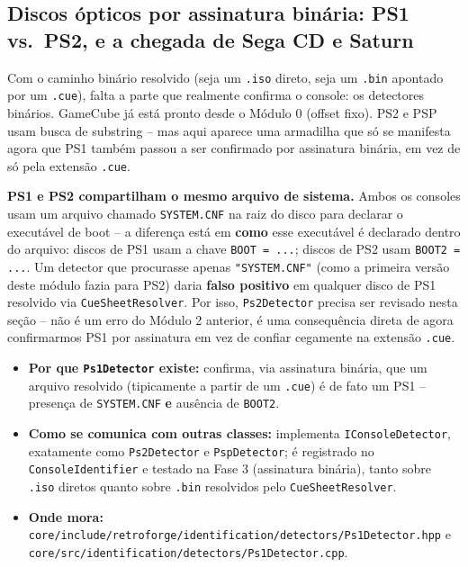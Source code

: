 \subsection{Discos ópticos por assinatura binária: PS1 vs.\ PS2, e a chegada de Sega CD e Saturn}

Com o caminho binário resolvido (seja um \texttt{.iso} direto, seja um \texttt{.bin} apontado por um \texttt{.cue}), falta a parte que realmente confirma o console: os detectores binários. GameCube já está pronto desde o Módulo 0 (offset fixo). PS2 e PSP usam busca de substring -- mas aqui aparece uma armadilha que só se manifesta agora que PS1 também passou a ser confirmado por assinatura binária, em vez de só pela extensão \texttt{.cue}.

\begin{CaixaAlerta}
\textbf{PS1 e PS2 compartilham o mesmo arquivo de sistema.} Ambos os consoles usam um arquivo chamado \texttt{SYSTEM.CNF} na raiz do disco para declarar o executável de boot -- a diferença está em \textbf{como} esse executável é declarado dentro do arquivo: discos de PS1 usam a chave \texttt{BOOT = ...}; discos de PS2 usam \texttt{BOOT2 = ...}. Um detector que procurasse apenas \texttt{"SYSTEM.CNF"} (como a primeira versão deste módulo fazia para PS2) daria \textbf{falso positivo} em qualquer disco de PS1 resolvido via \texttt{CueSheetResolver}. Por isso, \texttt{Ps2Detector} precisa ser revisado nesta seção -- não é um erro do Módulo 2 anterior, é uma consequência direta de agora confirmarmos PS1 por assinatura em vez de confiar cegamente na extensão \texttt{.cue}.
\end{CaixaAlerta}

\begin{itemize}
    \item \textbf{Por que \texttt{Ps1Detector} existe:} confirma, via assinatura binária, que um arquivo resolvido (tipicamente a partir de um \texttt{.cue}) é de fato um PS1 -- presença de \texttt{SYSTEM.CNF} \textbf{e} ausência de \texttt{BOOT2}.
    \item \textbf{Como se comunica com outras classes:} implementa \texttt{IConsoleDetector}, exatamente como \texttt{Ps2Detector} e \texttt{PspDetector}; é registrado no \texttt{ConsoleIdentifier} e testado na Fase 3 (assinatura binária), tanto sobre \texttt{.iso} diretos quanto sobre \texttt{.bin} resolvidos pelo \texttt{CueSheetResolver}.
    \item \textbf{Onde mora:} \texttt{core/include/retroforge/identification/detectors/Ps1Detector.hpp} e \texttt{core/src/identification/detectors/Ps1Detector.cpp}.
\end{itemize}

